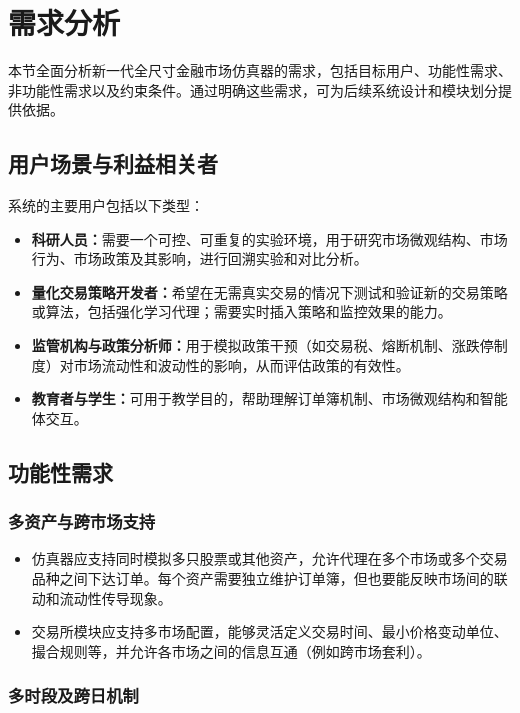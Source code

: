 \section{需求分析}

本节全面分析新一代全尺寸金融市场仿真器的需求，包括目标用户、功能性需求、非功能性需求以及约束条件。通过明确这些需求，可为后续系统设计和模块划分提供依据。

\subsection{用户场景与利益相关者}

系统的主要用户包括以下类型：
\begin{itemize}
  \item \textbf{科研人员：}需要一个可控、可重复的实验环境，用于研究市场微观结构、市场行为、市场政策及其影响，进行回溯实验和对比分析。
  \item \textbf{量化交易策略开发者：}希望在无需真实交易的情况下测试和验证新的交易策略或算法，包括强化学习代理；需要实时插入策略和监控效果的能力。
  \item \textbf{监管机构与政策分析师：}用于模拟政策干预（如交易税、熔断机制、涨跌停制度）对市场流动性和波动性的影响，从而评估政策的有效性。
  \item \textbf{教育者与学生：}可用于教学目的，帮助理解订单簿机制、市场微观结构和智能体交互。
\end{itemize}

\subsection{功能性需求}

\subsubsection{多资产与跨市场支持}

\begin{itemize}
  \item 仿真器应支持同时模拟多只股票或其他资产，允许代理在多个市场或多个交易品种之间下达订单。每个资产需要独立维护订单簿，但也要能反映市场间的联动和流动性传导现象。
  \item 交易所模块应支持多市场配置，能够灵活定义交易时间、最小价格变动单位、撮合规则等，并允许各市场之间的信息互通（例如跨市场套利）。
\end{itemize}

\subsubsection{多时段及跨日机制}

